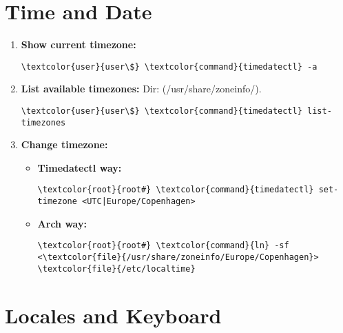 \documentclass[10pt, a4paper, onecolumn, openany]{book} %
\begin{document}
\section{Time and Date}
\begin{enumerate}
    \item \textbf{Show current timezone:}
\begin{Verbatim}[commandchars=\\\{\}]
\textcolor{user}{user\$} \textcolor{command}{timedatectl} -a
\end{Verbatim}
    \item \textbf{List available timezones:}
    \newline Dir: (\textcolor{dir}{/usr/share/zoneinfo/}).
\begin{Verbatim}[commandchars=\\\{\}]
\textcolor{user}{user\$} \textcolor{command}{timedatectl} list-timezones
\end{Verbatim}
    \item \textbf{Change timezone:}
    \begin{itemize}
        \item \textbf{Timedatectl way:}
\begin{Verbatim}[commandchars=\\\{\}]
\textcolor{root}{root#} \textcolor{command}{timedatectl} set-timezone <UTC|Europe/Copenhagen>
\end{Verbatim}        
        \item \textbf{Arch way:}
\begin{Verbatim}[commandchars=\\\{\}]
\textcolor{root}{root#} \textcolor{command}{ln} -sf <\textcolor{file}{/usr/share/zoneinfo/Europe/Copenhagen}> 
\textcolor{file}{/etc/localtime}
\end{Verbatim}
    \end{itemize}
\end{enumerate}
\section{Locales and Keyboard}
\end{document}
